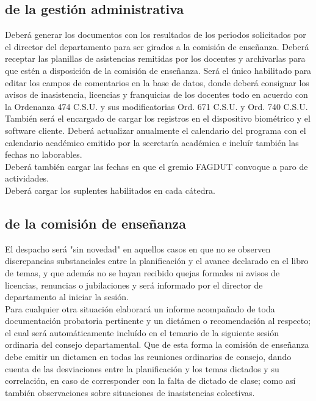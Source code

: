 \documentclass[a4paper, 11pt]{article} %
\begin{document}
\subsection{de la gestión administrativa}
 Deberá generar los documentos con los resultados de los periodos solicitados por el director del departamento para ser girados a la comisión de enseñanza. Deberá receptar las planillas de asistencias remitidas por los docentes y archivarlas para que estén a disposición de la comisión de enseñanza. Será el único habilitado para editar los campos de comentarios en la base de datos, donde deberá consignar los avisos de inasistencia, licencias y franquicias de los docentes todo en acuerdo con la Ordenanza 474 C.S.U. y sus modificatorias Ord. 671 C.S.U. y Ord. 740 C.S.U.\\
También será el encargado de cargar los registros en el dispositivo biométrico y el software cliente. Deberá actualizar anualmente el calendario del programa con el calendario académico emitido por la secretaría académica e incluír también las fechas no laborables.\\
Deberá también cargar las fechas en que el gremio FAGDUT convoque a paro de actividades.\\
Deberá cargar los suplentes habilitados en cada cátedra.
\subsection{de la comisión de enseñanza}
 El despacho será "sin novedad" en aquellos casos en que no se observen discrepancias substanciales entre la planificación y el avance declarado en el libro de temas, y que además no se hayan recibido quejas formales ni avisos de licencias, renuncias o jubilaciones y será informado por el director de departamento al iniciar la sesión.\\
Para cualquier otra situación elaborará un informe acompañado de toda documentación probatoria pertinente y un dictámen o recomendación al respecto; el cual será automáticamente incluído en el temario de la siguiente sesión ordinaria del consejo departamental.
Que de esta forma la comisión de enseñanza debe emitir un dictamen en todas las reuniones ordinarias de consejo, dando cuenta de las desviaciones entre la planificación y los temas dictados y su correlación, en caso de corresponder con la falta de dictado de clase; como así también observaciones sobre situaciones de inasistencias colectivas.
\end{document}
